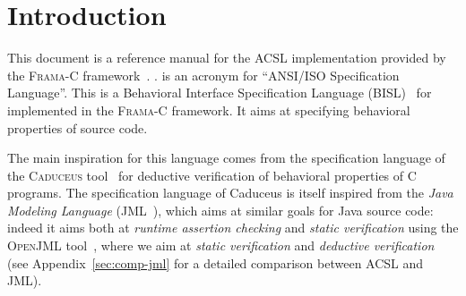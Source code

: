 \chapter{Introduction}

This document is a reference manual for
%
           {the ACSL implementation provided by the
             \mbox{\textsc{Frama-C}} %
            framework~\cite{frama-c}.}%
           {\NAME{}.}
\NAME{} is an acronym for ``ANSI/ISO \lang{} 
Specification Language''. 
This is a Behavioral Interface Specification Language (BISL)~\cite{hatcliff2012behavioral}
%
           {for}%
           {implemented in the \textsc{Frama-C} framework. It aims at}
specifying behavioral properties of \lang{}
source code.

%

The main inspiration for this language comes from the
specification language of the \textsc{Caduceus}
tool~\cite{filliatre04icfem,filliatre07cav} for deductive verification
of behavioral properties of C programs. The specification language of
Caduceus is itself inspired from the
\emph{Java Modeling Language} (JML~\cite{leavens00jml}), which aims at
similar goals for Java source code: indeed it aims both at
\emph{runtime assertion checking} and \emph{static verification} using
the \textsc{OpenJML} tool~\cite{Cok-2011-OpenJML,Cok-2014-OpenJML}, where we aim at
\emph{static verification} and \emph{deductive verification} (see
Appendix~\ref{sec:comp-jml} for a detailed comparison between ACSL and
JML).


